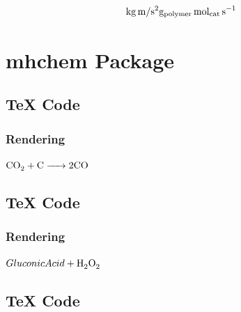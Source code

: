 \documentclass{book}
\newenvironment{Shaded}{}{}
\newcommand{\SpecialCharTok}[1]{\textcolor[rgb]{0.25,0.44,0.63}{#1}}
\newcommand{\SpecialStringTok}[1]{\textcolor[rgb]{0.73,0.40,0.53}{#1}}
\begin{document}
\[
  \si{kg.m/s^2} \\
  \si{g_{polymer}~mol_{cat}.s^{-1}}
\]

\hypertarget{mhchem-package}{%
\chapter{mhchem Package}\label{mhchem-package}}

\hypertarget{tex-code}{%
\section{TeX Code}\label{tex-code}}

\begin{Shaded}
\end{Shaded}

\hypertarget{rendering}{%
\subsection{Rendering}\label{rendering}}

\(\ce{CO2 + C -> 2 CO}\)

\hypertarget{tex-code-1}{%
\section{TeX Code}\label{tex-code-1}}

\begin{Shaded}
\end{Shaded}

\hypertarget{rendering-1}{%
\subsection{Rendering}\label{rendering-1}}

\(\ce{{Gluconic Acid} + H2O2}\)

\hypertarget{tex-code-2}{%
\section{TeX Code}\label{tex-code-2}}
\end{document}
